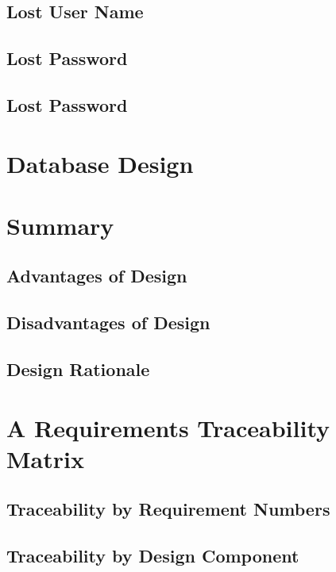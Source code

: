 \documentclass{article}
\begin{document}
\subsection{Lost User Name}
\subsection{Lost Password}
\subsection{Lost Password}
\section{Database Design}
\section{Summary}
\subsection{Advantages of Design}
\subsection{Disadvantages of Design}
\subsection{Design Rationale}
\section{A Requirements Traceability Matrix}
\subsection{Traceability by Requirement Numbers}
\subsection{Traceability by Design Component}
\end{document}
